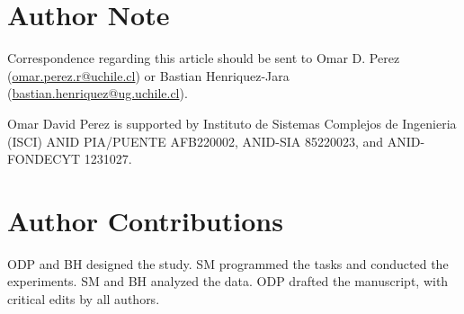 \section{Author Note}

Correspondence regarding this article should be sent to Omar D. Perez\\
(\href{mailto:omar.perez.r@uchile.cl}{omar.perez.r@uchile.cl}) or Bastian Henriquez-Jara\\
(\href{mailto:bastian.henriquez@ug.uchile.cl}{bastian.henriquez@ug.uchile.cl}).

Omar David Perez is supported by Instituto de Sistemas Complejos de Ingenieria (ISCI) ANID PIA/PUENTE AFB220002, ANID-SIA 85220023, and ANID-FONDECYT 1231027.

\section{Author Contributions}

ODP and BH designed the study. SM programmed the tasks and conducted the experiments. SM and BH analyzed the data. ODP drafted the manuscript, with critical edits by all authors.
